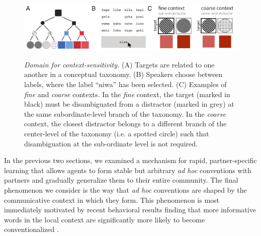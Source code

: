 
\begin{figure}[t]
\begin{center}
{\includegraphics[scale=1.6]{./figures/Sec2-design.pdf}}
{\caption{{\emph{Domain for context-sensitivity.} (A) Targets are related to one another in a conceptual taxonomy. (B) Speakers choose between labels, where the label ``niwa'' has been selected. (C) Examples of \emph{fine} and \emph{coarse} contexts. In the \emph{fine} context, the target (marked in black) must be disambiguated from a distractor (marked in grey) at the same subordinate-level branch of the taxonomy.  In the \emph{coarse} context, the closest distractor belongs to a different branch of the center-level of the taxonomy (i.e. a spotted circle) such that disambiguation at the sub-ordinate level is not required. \label{fig:context_design}}}}
\end{center}
\end{figure}

In the previous two sections, we examined a mechanism for rapid, partner-specific learning that allows agents to form stable but arbitrary \emph{ad hoc} conventions with partners and gradually generalize them to their entire community. 
The final phenomenon we consider is the way that \emph{ad hoc} conventions are shaped by the communicative context in which they form.
This phenomenon is most immediately motivated by recent behavioral results finding that more informative words in the local context are significantly more likely to become conventionalized \cite{hawkins2020characterizing}.



